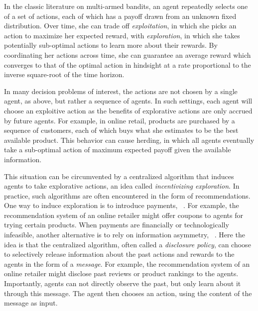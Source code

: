 


In the classic literature on multi-armed bandits, an agent repeatedly selects one of a set of actions, each of which has a payoff drawn from an unknown fixed distribution.  Over time, she can trade off {\em exploitation}, in which she picks an action to maximize her expected reward, with {\em exploration}, in which she takes potentially sub-optimal actions to learn more about their rewards.  By coordinating her actions across time, she can guarantee an average reward which converges to that of the optimal action in hindsight at a rate proportional to the inverse square-root of the time horizon.

In many decision problems of interest, the actions are not chosen by a single agent, as above, but rather a sequence of agents.  In such settings, each agent will choose an exploitive action as the benefits of explorative actions are only accrued by future agents.  For example, in online retail, products are purchased by a sequence of customers, each of which buys what she estimates to be the best available product.  This behavior can cause herding, in which all agents eventually take a sub-optimal action of maximum expected payoff given the available information.

This situation can be circumvented by a centralized algorithm that induces agents to take explorative actions, an idea called {\em incentivizing exploration}.  In practice, such algorithms are often encountered in the form of recommendations.  One way to induce exploration is to introduce payments, \eg~\cite{Frazier-ec14,KKMPRVW17,Kempe-colt18}. For example, the recommendation system of an online retailer might offer coupons to agents for trying certain products.  When payments are financially or technologically infeasible, another alternative is to rely on information asymmetry, \eg~\cite{Kremer-JPE14,Che-13,ICexploration-ec15,Bimpikis-exploration-ms17}.
Here the idea is that the centralized algorithm, often called a {\em disclosure policy}, can choose to selectively release information about the past actions and rewards to the agents in the form of a {\em message}.  For example, the recommendation system of an online retailer might disclose past reviews or product rankings to the agents.  Importantly, agents can not directly observe the past, but only learn about it through this message.  The agent then chooses an action, using the content of the message as input.  


